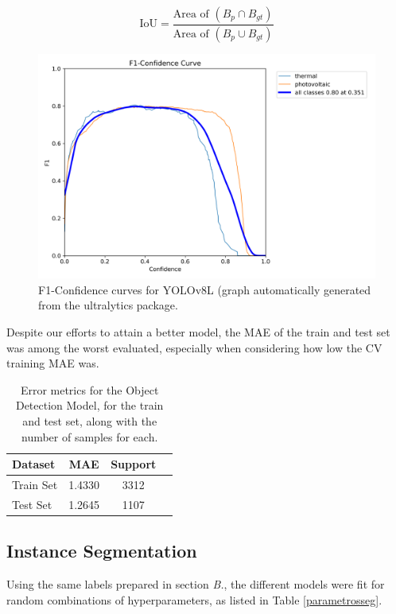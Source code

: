 \documentclass[conference]{IEEEtran}
\begin{document}
\[
\text{IoU} = \frac{\text{Area of } (B_p \cap B_{gt})}{\text{Area of } (B_p \cup B_{gt})}
\]

\begin{figure}[H]
    \centering
    \includegraphics[width=1\linewidth]{assets/model03_yolof1.png}
    \caption{F1-Confidence curves for YOLOv8L (graph automatically generated from the ultralytics package.}
    \label{fig:model03_yolof1}
\end{figure}

Despite our efforts to attain a better model, the MAE of the train and test set was among the worst evaluated, especially when considering how low the CV training MAE was.

\begin{table}[H]
\centering
\caption{Error metrics for the Object Detection Model, for the train and test set, along with the number of samples for each.}
\label{tab:model03_results}
\begin{tabular}{lccc}
\toprule
\textbf{Dataset} & \textbf{MAE} & \textbf{Support} \\
\midrule
Train Set & 1.4330 & 3312 \\
Test Set & 1.2645 & 1107 \\
\bottomrule
\end{tabular}
\end{table}

\subsection{Instance Segmentation}

Using the same labels prepared in section \textit{B.}, the different models were fit for random combinations of hyperparameters, as  listed in Table \ref{parametrosseg}.
\end{document}
